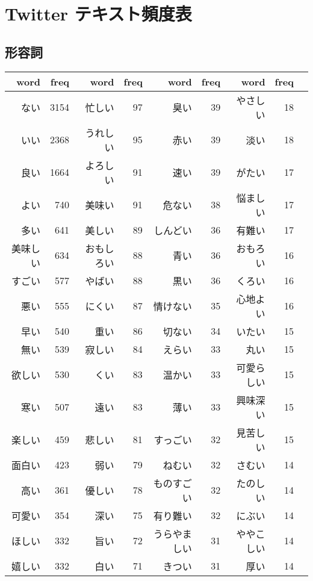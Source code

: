 \appendix
\chapter{Twitter テキスト頻度表}
\section{形容詞}
\begin{longtable}{rrrrrrrrr}
\hline
word & freq & word & freq & word & freq & word & freq \\
\hline\endhead\hline\endfoot
ない & 3154 & 忙しい & 97 & 臭い & 39 & やさしい & 18 \\
いい & 2368 & うれしい & 95 & 赤い & 39 & 淡い & 18 \\
良い & 1664 & よろしい & 91 & 速い & 39 & がたい & 17 \\
よい & 740 & 美味い & 91 & 危ない & 38 & 悩ましい & 17 \\
多い & 641 & 美しい & 89 & しんどい & 36 & 有難い & 17 \\
美味しい & 634 & おもしろい & 88 & 青い & 36 & おもろい & 16 \\
すごい & 577 & やばい & 88 & 黒い & 36 & くろい & 16 \\
悪い & 555 & にくい & 87 & 情けない & 35 & 心地よい & 16 \\
早い & 540 & 重い & 86 & 切ない & 34 & いたい & 15 \\
無い & 539 & 寂しい & 84 & えらい & 33 & 丸い & 15 \\
欲しい & 530 & くい & 83 & 温かい & 33 & 可愛らしい & 15 \\
寒い & 507 & 遠い & 83 & 薄い & 33 & 興味深い & 15 \\
楽しい & 459 & 悲しい & 81 & すっごい & 32 & 見苦しい & 15 \\
面白い & 423 & 弱い & 79 & ねむい & 32 & さむい & 14 \\
高い & 361 & 優しい & 78 & ものすごい & 32 & たのしい & 14 \\
可愛い & 354 & 深い & 75 & 有り難い & 32 & にぶい & 14 \\
ほしい & 332 & 旨い & 72 & うらやましい & 31 & ややこしい & 14 \\
嬉しい & 332 & 白い & 71 & きつい & 31 & 厚い & 14 \\

\end{longtable}
